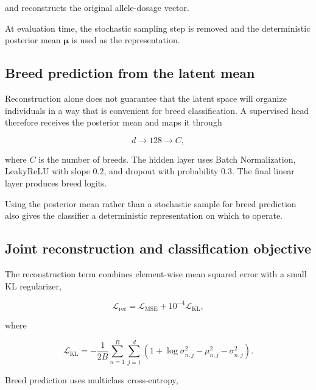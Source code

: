 and reconstructs the original allele-dosage vector.

At evaluation time, the stochastic sampling step is removed and the
deterministic posterior mean $\boldsymbol{\mu}$ is used as the
representation.

\subsection{Breed prediction from the latent mean}

Reconstruction alone does not guarantee that the latent space will
organize individuals in a way that is convenient for breed
classification. A supervised head therefore receives the
posterior mean and maps it through

\begin{equation}
    d
    \rightarrow
    128
    \rightarrow
    C,
\end{equation}

where $C$ is the number of breeds. The hidden layer uses Batch
Normalization, LeakyReLU with slope $0.2$, and dropout with
probability $0.3$. The final linear layer produces breed logits.

Using the posterior mean rather than a stochastic sample for breed
prediction also gives the classifier a deterministic representation
on which to operate.

\subsection{Joint reconstruction and classification objective}

The reconstruction term combines element-wise mean squared error with
a small KL regularizer,

\begin{equation}
    \mathcal{L}_{\mathrm{rec}}
    =
    \mathcal{L}_{\mathrm{MSE}}
    +
    10^{-4}
    \mathcal{L}_{\mathrm{KL}},
\end{equation}

where

\begin{equation}
    \mathcal{L}_{\mathrm{KL}}
    =
    -\frac{1}{2B}
    \sum_{n=1}^{B}
    \sum_{j=1}^{d}
    \left(
        1
        +
        \log\sigma_{n,j}^{2}
        -
        \mu_{n,j}^{2}
        -
        \sigma_{n,j}^{2}
    \right).
\end{equation}

Breed prediction uses multiclass cross-entropy,

